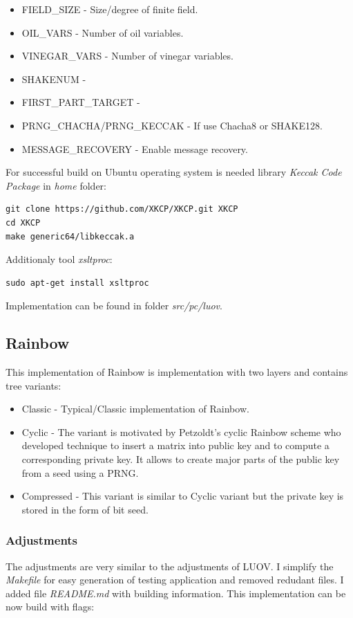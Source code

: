 \documentclass[thesis=M,english]{FITthesis}[2019/12/23]
\begin{document}
\begin{itemize}
\item	FIELD\_SIZE - Size/degree of finite field.
\item	OIL\_VARS - Number of oil variables.
\item	VINEGAR\_VARS - Number of vinegar variables.
\item	SHAKENUM - 
\item	FIRST\_PART\_TARGET - 
\item	PRNG\_CHACHA/PRNG\_KECCAK - If use Chacha8 or SHAKE128. 
\item	MESSAGE\_RECOVERY - Enable message recovery.
\end{itemize}

For successful build on Ubuntu operating system is needed library \textit{Keccak Code Package} in \textit{home} folder:
\begin{lstlisting}[frame=single]
git clone https://github.com/XKCP/XKCP.git XKCP
cd XKCP
make generic64/libkeccak.a
\end{lstlisting}
Additionaly tool \textit{xsltproc}:
\begin{lstlisting}[frame=single]
sudo apt-get install xsltproc
\end{lstlisting}

\bigskip
\noindent
Implementation can be found in folder \textit{src/pc/luov}. 

\subsection{Rainbow}
This implementation of Rainbow is implementation with two layers and contains tree variants:
\begin{itemize}
\item	Classic - Typical/Classic implementation of Rainbow.
\item	Cyclic - The variant is motivated by Petzoldt's cyclic Rainbow scheme\cite{L-RB-CYC} who developed technique to insert a matrix into public key and to compute a corresponding private key. It allows to create major parts of the public key from a seed using a PRNG.
\item	Compressed - This variant is similar to Cyclic variant but the private key is stored in the form of bit seed.  
\end{itemize}

\subsubsection{Adjustments}
The adjustments are very similar to the adjustments of LUOV. I simplify the \textit{Makefile} for easy generation of testing application and removed redudant files. I added file \textit{README.md} with building information. This implementation can be now build with flags:
\end{document}
